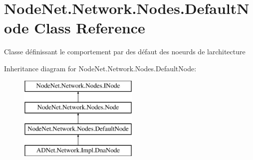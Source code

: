 \hypertarget{class_node_net_1_1_network_1_1_nodes_1_1_default_node}{}\section{Node\+Net.\+Network.\+Nodes.\+Default\+Node Class Reference}
\label{class_node_net_1_1_network_1_1_nodes_1_1_default_node}


Classe définissant le comportement par des défaut des noeurds de l\textquotesingle{}architecture  


Inheritance diagram for Node\+Net.\+Network.\+Nodes.\+Default\+Node\+:\begin{figure}[H]
\begin{center}
\leavevmode
\includegraphics[height=4.000000cm]{class_node_net_1_1_network_1_1_nodes_1_1_default_node}
\end{center}
\end{figure}
